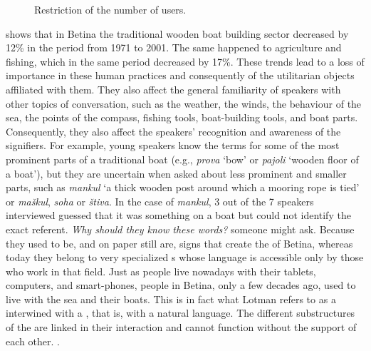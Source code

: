 \documentclass[output=paper]{LSP/langsci}
\begin{document}
\begin{figure}[p]


	\caption{Restriction of the number of users.}
\label{fig:skevin:3}
\end{figure}
 shows that in Betina the traditional wooden boat building sector decreased by 12\% in the period from 1971 to 2001. The same happened to agriculture and fishing, which in the same period decreased by 17\%. These trends lead to a loss of importance in these human practices and consequently of the utilitarian objects affiliated with them. They also affect the general familiarity of speakers with other topics of conversation, such as the weather, the winds, the behaviour of the sea, the points of the compass, fishing tools, boat-building tools, and boat parts. Consequently, they also affect the speakers’ recognition and awareness of the signifiers. For example, young speakers know the terms for some of the most prominent parts of a traditional boat (e.g.,  \textit{prova} `bow' or \textit{pajoli} `wooden floor of a boat'), but they are uncertain when asked about less prominent and smaller parts, such as \textit{mankul} `a thick wooden post around which a mooring rope is tied' or \textit{maškul}, \textit{soha} or \textit{štiva}. In the case of \textit{mankul}, 3 out of the 7 speakers interviewed guessed that it was something on a boat but could not identify the exact referent. \textit{Why should they know these words?} someone might ask. Because they used to be, and on paper still are, signs that create the  of Betina, whereas today they belong to very specialized s whose language is accessible only by those who work in that field. Just as people live nowadays with their tablets, computers, and smart-phones, people in Betina, only a few decades ago, used to live with the sea and their boats. This is in fact what Lotman refers to as a  interwined with a , that is, with a natural language. The different substructures of the  are linked in their interaction and cannot function without the support of each other. \citep[219]{lotman_semiosphere_1985}.
\end{document}
